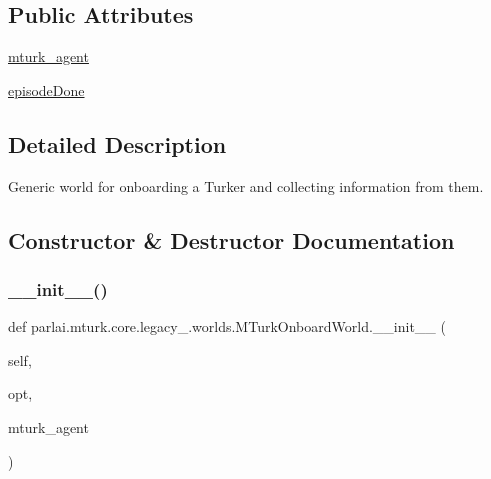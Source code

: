 \subsection*{Public Attributes}
\begin{DoxyCompactItemize}
\item 
\hyperlink{classparlai_1_1mturk_1_1core_1_1legacy__2018_1_1worlds_1_1MTurkOnboardWorld_a434294c870fa0b31b2889eb1f384e408}{mturk\+\_\+agent}
\item 
\hyperlink{classparlai_1_1mturk_1_1core_1_1legacy__2018_1_1worlds_1_1MTurkOnboardWorld_af559fbe40e694152eb7e1531cddc1cc7}{episode\+Done}
\end{DoxyCompactItemize}


\subsection{Detailed Description}
\begin{DoxyVerb}Generic world for onboarding a Turker and collecting information from them.
\end{DoxyVerb}
 

\subsection{Constructor \& Destructor Documentation}
\mbox{\label{classparlai_1_1mturk_1_1core_1_1legacy__2018_1_1worlds_1_1MTurkOnboardWorld_ab513ad6fb58f11f9f30f0bd73e0b6b51}} 
\subsubsection{\texorpdfstring{\+\_\+\+\_\+init\+\_\+\+\_\+()}{\_\_init\_\_()}}
{\footnotesize\ttfamily def parlai.\+mturk.\+core.\+legacy\+\_.\+worlds.\+M\+Turk\+Onboard\+World.\+\_\+\+\_\+init\+\_\+\+\_\+ (\begin{DoxyParamCaption}\item[{}]{self,  }\item[{}]{opt,  }\item[{}]{mturk\+\_\+agent }\end{DoxyParamCaption})}

